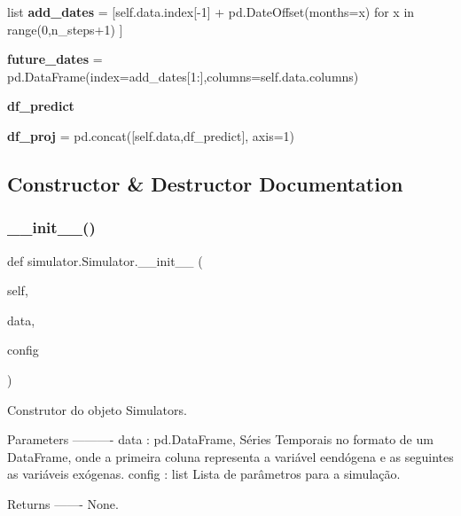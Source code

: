 \begin{DoxyCompactItemize}
list {\bfseries add\+\_\+dates} = \mbox{[}self.\+data.\+index\mbox{[}-\/1\mbox{]} + pd.\+Date\+Offset(months=x) for x in range(0,n\+\_\+steps+1) \mbox{]}
\item 
\mbox{\label{classsimulator_1_1Simulator_a4f669fa37482befc8451d1caf1023485}} 
{\bfseries future\+\_\+dates} = pd.\+Data\+Frame(index=add\+\_\+dates\mbox{[}1\+:\mbox{]},columns=self.\+data.\+columns)
\item 
{\bfseries df\+\_\+predict}
\item 
\mbox{\label{classsimulator_1_1Simulator_a022453d69b38b30f5db5073a47f0f293}} 
{\bfseries df\+\_\+proj} = pd.\+concat(\mbox{[}self.\+data,df\+\_\+predict\mbox{]}, axis=1)
\end{DoxyCompactItemize}


\subsection{Constructor \& Destructor Documentation}
\mbox{\label{classsimulator_1_1Simulator_a0f2191dc72d6be5f4e049081940bfe46}} 
\subsubsection{\texorpdfstring{\+\_\+\+\_\+init\+\_\+\+\_\+()}{\_\_init\_\_()}}
{\footnotesize\ttfamily def simulator.\+Simulator.\+\_\+\+\_\+init\+\_\+\+\_\+ (\begin{DoxyParamCaption}\item[{}]{self,  }\item[{}]{data,  }\item[{}]{config }\end{DoxyParamCaption})}

\begin{DoxyVerb}Construtor do objeto Simulators.

Parameters
----------
data : pd.DataFrame,
    Séries Temporais no formato de um DataFrame, onde a primeira coluna
    representa a variável eendógena e as seguintes as variáveis exógenas.
config : list
    Lista de parâmetros para a simulação.

Returns
-------
None.\end{DoxyVerb}
 

